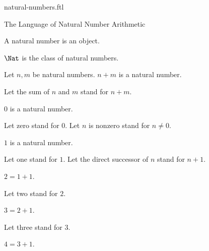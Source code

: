 \documentclass{naproche-library}
\begin{document}
\begin{smodule}[title=Natural Numbers]{natural-numbers.ftl}

\begin{sfragment}{The Language of Natural Number Arithmetic}
  \begin{signature}[forthel,id=ARITHMETIC_01_3074681254969344]
    A natural number is an object.
  \end{signature}

  \begin{definition}[forthel,id=ARITHMETIC_01_7367148418629632]
    $\Nat$ is the class of natural numbers.
  \end{definition}

  \begin{signature}[forthel,id=ARITHMETIC_01_1567933815848960]
    Let $n, m$ be natural numbers.
    $n + m$ is a natural number.

    Let the sum of $n$ and $m$ stand for $n + m$.
  \end{signature}

  \begin{signature}[forthel,id=ARITHMETIC_01_7633304715001856]
    $0$ is a natural number.

    Let zero stand for $0$.
    Let $n$ is nonzero stand for $n \neq 0$.
  \end{signature}

  \begin{signature}[forthel,id=ARITHMETIC_01_1200254566985232]
    $1$ is a natural number.

    Let one stand for $1$.
    Let the direct successor of $n$ stand for $n + 1$.
  \end{signature}

  \begin{definition}[forthel,id=ARITHMETIC_01_4584236572999680]
    $2 = 1 + 1$.

    Let two stand for $2$.
  \end{definition}

  \begin{definition}[forthel,id=ARITHMETIC_01_3836725109456896]
    $3 = 2 + 1$.

    Let three stand for $3$.
  \end{definition}

  \begin{definition}[forthel,id=ARITHMETIC_01_1709884968009728]
    $4 = 3 + 1$.


\end{definition}
\end{sfragment}
\end{smodule}
\end{document}
